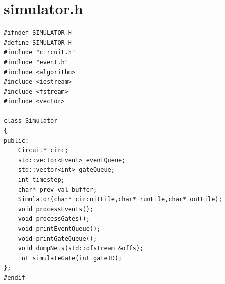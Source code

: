 \documentclass[a4paper,onesided,12pt]{report}
\begin{document}
\section{simulator.h}
\begin{verbatim}
#ifndef SIMULATOR_H
#define SIMULATOR_H
#include "circuit.h"
#include "event.h"
#include <algorithm>
#include <iostream>
#include <fstream>
#include <vector>

class Simulator
{
public:
	Circuit* circ;
	std::vector<Event> eventQueue;
	std::vector<int> gateQueue;
	int timestep;
	char* prev_val_buffer;
	Simulator(char* circuitFile,char* runFile,char* outFile);
	void processEvents();
	void processGates();
	void printEventQueue();
	void printGateQueue();
	void dumpNets(std::ofstream &offs);
	int simulateGate(int gateID);
};
#endif																								
\end{verbatim}
\end{document}
